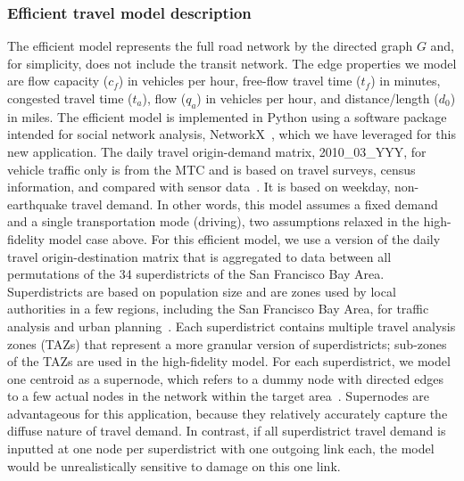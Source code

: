 \subsubsection{Efficient travel model description}
The efficient model represents the full road network by the directed graph $G$ and, for simplicity, does not include the transit network. The edge properties we model are flow capacity ($c_f$) in vehicles per hour, free-flow travel time ($t_f$) in minutes, congested travel time ($t_a$), flow  ($q_a$) in vehicles per hour, and distance/length ($d_0$) in miles. The efficient model is implemented in Python using a software package intended for social network analysis, NetworkX~\cite{hagberg_exploring_2008}, which we have leveraged for this new application. The daily travel origin-demand matrix, 2010\_03\_YYY, for vehicle traffic only is from the MTC and is based on travel surveys, census information, and compared with sensor data~\cite{erhardt_mtcs_2012,ory_initial_2012}. It is based on weekday, non-earthquake travel demand. In other words, this model assumes a fixed demand and a single transportation mode (driving), two assumptions relaxed in the high-fidelity model case above. For this efficient model, we use a version of the daily travel origin-destination matrix that is aggregated to data between all permutations of the 34 superdistricts of the San Francisco Bay Area. Superdistricts are based on population size and are zones used by local authorities in a few regions, including the San Francisco Bay Area, for traffic analysis and urban planning~\cite{national_cooperative_highway_research_program_nchrp_predicting_2005}. Each superdistrict contains multiple travel analysis zones (TAZs) that represent a more granular version of superdistricts; sub-zones of the TAZs are used in the high-fidelity model. For each superdistrict, we model one centroid as a supernode, which refers to a dummy node with directed edges to a few actual nodes in the network within the target area~\cite{lim_seismic_2014}. 
Supernodes are advantageous for this application, because they relatively accurately capture the diffuse nature of travel demand. In contrast, if all superdistrict travel demand is inputted at one node per superdistrict with one outgoing link each, the model would be unrealistically sensitive to damage on this one link.
